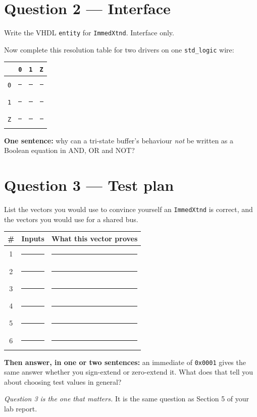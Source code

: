 \documentclass[11pt]{article}
\newcommand{\code}[1]{\texttt{#1}}
\newcommand{\answerbox}[1]{\vspace{2pt}\fbox{\parbox[c][#1][c]{\dimexpr\linewidth-2\fboxsep-2\fboxrule}{\ }}\vspace{4pt}}
\begin{document}
\section*{Question 2 --- Interface}

Write the VHDL \code{entity} for \code{ImmedXtnd}. Interface only.

\answerbox{4.0cm}

Now complete this resolution table for two drivers on one \code{std\_logic} wire:

\begin{center}
\begin{tabular}{c||ccc}
\toprule
& \code{0} & \code{1} & \code{Z} \\
\midrule
\code{0} & \rule{1.2cm}{0.4pt} & \rule{1.2cm}{0.4pt} & \rule{1.2cm}{0.4pt} \\[5pt]
\code{1} & \rule{1.2cm}{0.4pt} & \rule{1.2cm}{0.4pt} & \rule{1.2cm}{0.4pt} \\[5pt]
\code{Z} & \rule{1.2cm}{0.4pt} & \rule{1.2cm}{0.4pt} & \rule{1.2cm}{0.4pt} \\
\bottomrule
\end{tabular}
\end{center}

\textbf{One sentence:} why can a tri-state buffer's behaviour \emph{not} be
written as a Boolean equation in AND, OR and NOT?

\answerbox{1.4cm}

\section*{Question 3 --- Test plan}

List the vectors you would use to convince yourself an \code{ImmedXtnd} is
correct, and the vectors you would use for a shared bus.

\begin{center}
\begin{tabular}{@{}c@{\hskip 8pt}p{5.0cm}@{\hskip 8pt}p{7.6cm}@{}}
\toprule
\# & Inputs & What this vector proves \\
\midrule
1 & \rule{4.8cm}{0.4pt} & \rule{7.4cm}{0.4pt} \\[8pt]
2 & \rule{4.8cm}{0.4pt} & \rule{7.4cm}{0.4pt} \\[8pt]
3 & \rule{4.8cm}{0.4pt} & \rule{7.4cm}{0.4pt} \\[8pt]
4 & \rule{4.8cm}{0.4pt} & \rule{7.4cm}{0.4pt} \\[8pt]
5 & \rule{4.8cm}{0.4pt} & \rule{7.4cm}{0.4pt} \\[8pt]
6 & \rule{4.8cm}{0.4pt} & \rule{7.4cm}{0.4pt} \\
\bottomrule
\end{tabular}
\end{center}

\textbf{Then answer, in one or two sentences:} an immediate of \code{0x0001}
gives the same answer whether you sign-extend or zero-extend it. What does that
tell you about choosing test values in general?

\answerbox{2.0cm}

\vfill
{\small\emph{Question 3 is the one that matters.} It is the same question as
Section 5 of your lab report.}
\end{document}
